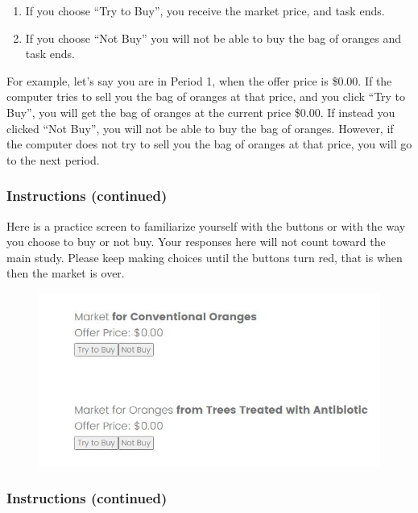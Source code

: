 \documentclass[12pt]{article}
\begin{document}
\begin{enumerate}
    \item If you choose “Try to Buy”, you receive the market price, and task ends.
    \item If you choose “Not Buy” you will not be able to buy the bag of oranges and task ends.
\end{enumerate}


For example, let’s say you are in Period 1, when the offer price is \$0.00. If the computer tries to sell you the bag of oranges at that price, and you click “Try to Buy”, you will get the bag of oranges at the current price \$0.00. If instead you clicked “Not Buy”, you will not be able to buy the bag of oranges. However, if the computer does not try to sell you the bag of oranges at that price, you will go to the next period.

\clearpage



\subsubsection*{\textbf{Instructions (continued)}}


Here is a practice screen to familiarize yourself with the buttons or with the way you choose to buy or not buy. Your responses here will not count toward the main study.
Please keep making choices until the buttons turn red, that is when then the market is over.

\begin{figure}[H]
    \centering
    \includegraphics[width=0.8\linewidth]{GSO.JPG}
    
    \label{fig:GSO}
\end{figure}

\clearpage


\subsubsection*{\textbf{Instructions (continued)}}
\end{document}
